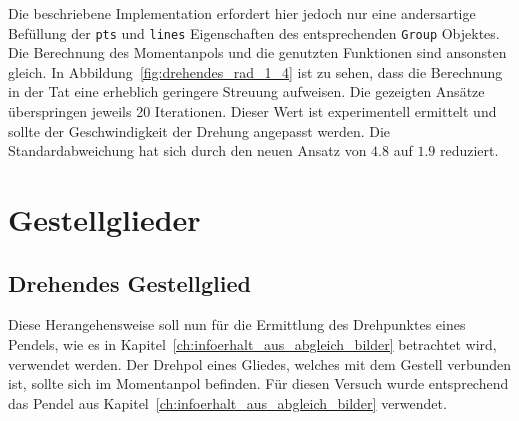 Die beschriebene Implementation erfordert hier jedoch nur eine andersartige Befüllung der \lstinline{pts} und \lstinline{lines} Eigenschaften des entsprechenden \lstinline{Group} Objektes.
Die Berechnung des Momentanpols und die genutzten Funktionen sind ansonsten gleich.
In Abbildung~\ref{fig:drehendes_rad_1_4} ist zu sehen, dass die Berechnung in der Tat eine erheblich geringere Streuung aufweisen.
Die gezeigten Ansätze überspringen jeweils 20 Iterationen.
Dieser Wert ist experimentell ermittelt und sollte der Geschwindigkeit der Drehung angepasst werden.
Die Standardabweichung hat sich durch den neuen Ansatz von $4.8$ auf $1.9$ reduziert.

\section{Gestellglieder}

\subsection{Drehendes Gestellglied}

Diese Herangehensweise soll nun für die Ermittlung des Drehpunktes eines Pendels, wie es in Kapitel~\ref{ch:infoerhalt_aus_abgleich_bilder} betrachtet wird, verwendet werden.
Der Drehpol eines Gliedes, welches mit dem Gestell verbunden ist, sollte sich im Momentanpol befinden.
Für diesen Versuch wurde entsprechend das Pendel aus Kapitel~\ref{ch:infoerhalt_aus_abgleich_bilder} verwendet.

